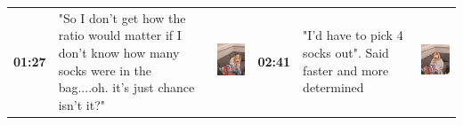 \documentclass[twocolumn, serif, empirical, authordate]{jote-article}
\begin{document}
\begin{table}[ht!]
\begin{mdframed}[linecolor=jotedark]
\begin{tabularx}{\linewidth}{@{} p{.05\linewidth} p{.28\linewidth} >{\raggedleft\arraybackslash}p{.1\linewidth}  p{.05\linewidth} p{.28\linewidth} >{\raggedleft\arraybackslash}p{.1\linewidth} @{}}
\textbf{01:27} & "So I don't get how the ratio would matter if I don't know how many socks were in the bag....oh. it's just chance isn't it?" & \includegraphics[height=.09\textheight, valign=t]{media/image17.png} &
 \textbf{02:41} & "I'd have to pick 4 socks out". Said faster and more determined & \includegraphics[height=.09\textheight, valign=t]{media/image25.png} \\ 
 

\end{tabularx}
\end{mdframed}
\end{table}
\end{document}
